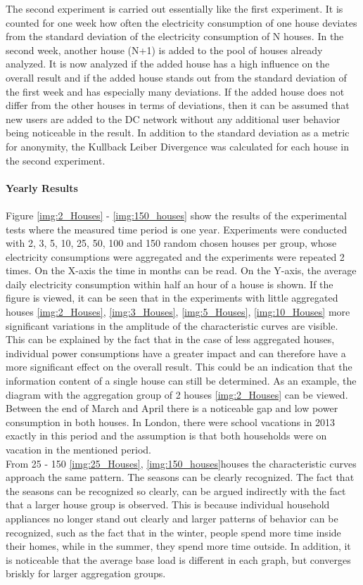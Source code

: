 The second experiment is carried out essentially like the first experiment. It is counted for one week how often the electricity consumption of one house deviates from the standard deviation of the electricity consumption of N houses. In the second week, another house (N+1) is added to the pool of houses already analyzed. It is now analyzed if the added house has a high influence on the overall result and if the added house stands out from the standard deviation of the first week and has especially many deviations. If the added house does not differ from the other houses in terms of deviations, then it can be assumed that new users are added to the DC network without any additional user behavior being noticeable in the result. In addition to the standard deviation as a metric for anonymity, the Kullback Leiber Divergence was calculated for each house in the second experiment. 
\\
\\
\textbf{Yearly Results}
\\
\\
Figure \ref{img:2_Houses} - \ref{img:150_houses} show the results of the experimental tests where the measured time period is one year. Experiments were conducted with 2, 3, 5, 10, 25, 50, 100 and 150 random chosen houses per group, whose electricity consumptions were aggregated and the experiments were repeated 2 times. On the X-axis the time in months can be read. On the Y-axis, the average daily electricity consumption within half an hour of a house is shown. If the figure is viewed, it can be seen that in the experiments with little aggregated houses \ref{img:2_Houses}, \ref{img:3_Houses}, \ref{img:5_Houses}, \ref{img:10_Houses} more significant variations in the amplitude of the characteristic curves are visible. This can be explained by the fact that in the case of less aggregated houses, individual power consumptions have a greater impact and can therefore have a more significant effect on the overall result. This could be an indication that the information content of a single house can still be determined. As an example, the diagram  with the aggregation group of 2 houses \ref{img:2_Houses} can be viewed. Between the end of March and April there is a noticeable gap and low power consumption in both houses. In London, there were school vacations in 2013 exactly in this period and the assumption is that both households were on vacation in the mentioned period.\\
From 25 - 150 \ref{img:25_Houses}, \ref{img:150_houses}houses the characteristic curves approach the same pattern. The seasons can be clearly recognized. The fact that the seasons can be recognized so clearly, can be argued indirectly with the fact that a larger house group is observed. This is because individual household appliances no longer stand out clearly and larger patterns of behavior can be recognized, such as the fact that in the winter, people spend more time inside their homes, while in the summer, they spend more time outside. In addition, it is noticeable that the average base load is different in each graph, but converges briskly for larger aggregation groups. \\
